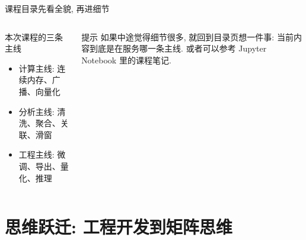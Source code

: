 \documentclass[aspectratio=169,9pt]{beamer}
\begin{document}
\begin{frame}{课程目录}{先看全貌, 再进细节}
\begin{columns}[T]
    \tableofcontents[hideallsubsections]

    \begin{block}{本次课程的三条主线}
    \begin{itemize}
        \item 计算主线: 连续内存、广播、向量化
        \item 分析主线: 清洗、聚合、关联、滑窗
        \item 工程主线: 微调、导出、量化、推理
    \end{itemize}
    \end{block}

    \begin{alertblock}{提示}
        \scriptsize 如果中途觉得细节很多, 就回到目录页想一件事: 当前内容到底是在服务哪一条主线. 或者可以参考 Jupyter Notebook 里的课程笔记.
    \end{alertblock}
\end{columns}
\end{frame}

\section{思维跃迁: 工程开发到矩阵思维}
\end{document}
